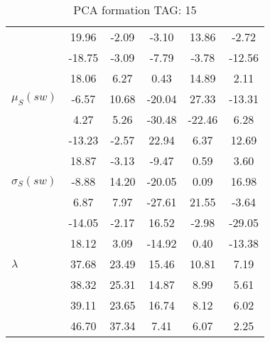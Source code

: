 \begin{table}[h!]
\begin{center}
\begin{tabular}{| l || c | c | c | c | c |}
 & 19.96  & -2.09  & -3.10  & 13.86  & -2.72 \\
 & -18.75  & -3.09  & -7.79  & -3.78  & -12.56 \\
 & 18.06  & 6.27  & 0.43  & 14.89  & 2.11 \\\hline
$\mu_S(sw)$ & -6.57  & 10.68  & -20.04  & 27.33  & -13.31 \\
 & 4.27  & 5.26  & -30.48  & -22.46  & 6.28 \\
 & -13.23  & -2.57  & 22.94  & 6.37  & 12.69 \\
 & 18.87  & -3.13  & -9.47  & 0.59  & 3.60 \\\hline
$\sigma_S(sw)$ & -8.88  & 14.20  & -20.05  & 0.09  & 16.98 \\
 & 6.87  & 7.97  & -27.61  & 21.55  & -3.64 \\
 & -14.05  & -2.17  & 16.52  & -2.98  & -29.05 \\
 & 18.12  & 3.09  & -14.92  & 0.40  & -13.38 \\\hline\hline
$\lambda$ & 37.68  & 23.49  & 15.46  & 10.81  & 7.19 \\
 & 38.32  & 25.31  & 14.87  & 8.99  & 5.61 \\
 & 39.11  & 23.65  & 16.74  & 8.12  & 6.02 \\
 & 46.70  & 37.34  & 7.41  & 6.07  & 2.25 \\\hline
\end{tabular}
\caption{PCA formation TAG: 15}
\end{center}
\end{table}